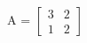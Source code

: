 \documentclass[preview]{standalone}
\begin{document}
\begin{center}
A = $\begin{bmatrix}3 & 2 \\ 1 & 2\end{bmatrix}$
\end{center}
\end{document}
